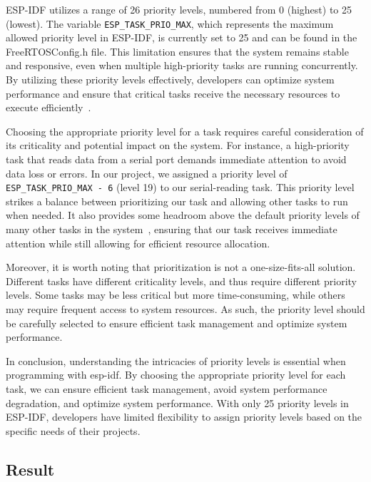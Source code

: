 ESP-IDF utilizes a range of 26 priority levels, numbered from 0 (highest) to 25 (lowest). The variable \texttt{ESP\_TASK\_PRIO\_MAX}, which represents the maximum allowed priority level in ESP-IDF, is currently set to 25 and can be found in the FreeRTOSConfig.h file\cite{espressif:freertosconfig}. This limitation ensures that the system remains stable and responsive, even when multiple high-priority tasks are running concurrently. By utilizing these priority levels effectively, developers can optimize system performance and ensure that critical tasks receive the necessary resources to execute efficiently~\cite{espressif:esp-idf-programming-guide}.

Choosing the appropriate priority level for a task requires careful consideration of its criticality and potential impact on the system. For instance, a high-priority task that reads data from a serial port demands immediate attention to avoid data loss or errors. In our project, we assigned a priority level of \texttt{ESP\_TASK\_PRIO\_MAX - 6} (level 19) to our serial-reading task. This priority level strikes a balance between prioritizing our task and allowing other tasks to run when needed. It also provides some headroom above the default priority levels of many other tasks in the system~\cite{espressif:esp-idf-programming-guide}, ensuring that our task receives immediate attention while still allowing for efficient resource allocation.

Moreover, it is worth noting that prioritization is not a one-size-fits-all solution. Different tasks have different criticality levels, and thus require different priority levels. Some tasks may be less critical but more time-consuming, while others may require frequent access to system resources. As such, the priority level should be carefully selected to ensure efficient task management and optimize system performance.

In conclusion, understanding the intricacies of priority levels is essential when programming with esp-idf. By choosing the appropriate priority level for each task, we can ensure efficient task management, avoid system performance degradation, and optimize system performance. With only 25 priority levels in ESP-IDF, developers have limited flexibility to assign priority levels based on the specific needs of their projects.

\subsection{Result}\label{sec:result}

